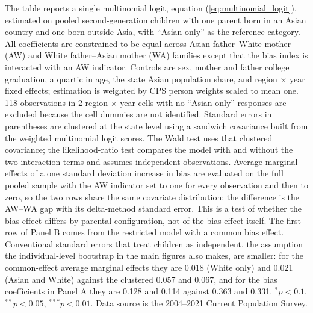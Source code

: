 \begin{table}[H]
\begin{threeparttable}
\begin{tablenotes}
\item[1] \footnotesize{The table reports a single multinomial logit, equation (\ref{eq:multinomial_logit}), estimated on pooled second-generation children with one parent born in an Asian country and one born outside Asia, with ``Asian only'' as the reference category. All coefficients are constrained to be equal across Asian father--White mother (AW) and White father--Asian mother (WA) families except that the bias index is interacted with an AW indicator. Controls are sex, mother and father college graduation, a quartic in age, the state Asian population share, and region $\times$ year fixed effects; estimation is weighted by CPS person weights scaled to mean one. 118 observations in 2 region $\times$ year cells with no ``Asian only'' responses are excluded because the cell dummies are not identified. Standard errors in parentheses are clustered at the state level using a sandwich covariance built from the weighted multinomial logit scores. The Wald test uses that clustered covariance; the likelihood-ratio test compares the model with and without the two interaction terms and assumes independent observations. Average marginal effects of a one standard deviation increase in bias are evaluated on the full pooled sample with the AW indicator set to one for every observation and then to zero, so the two rows share the same covariate distribution; the difference is the AW--WA gap with its delta-method standard error. This is a test of whether the bias effect differs by parental configuration, not of the bias effect itself. The first row of Panel B comes from the restricted model with a common bias effect. Conventional standard errors that treat children as independent, the assumption the individual-level bootstrap in the main figures also makes, are smaller: for the common-effect average marginal effects they are 0.018 (White only) and 0.021 (Asian and White) against the clustered 0.057 and 0.067, and for the bias coefficients in Panel A they are 0.128 and 0.114 against 0.363 and 0.331. $^{*}p<0.1$, $^{**}p<0.05$, $^{***}p<0.01$. Data source is the 2004--2021 Current Population Survey.}
\end{tablenotes}
\end{threeparttable}
\end{table}
